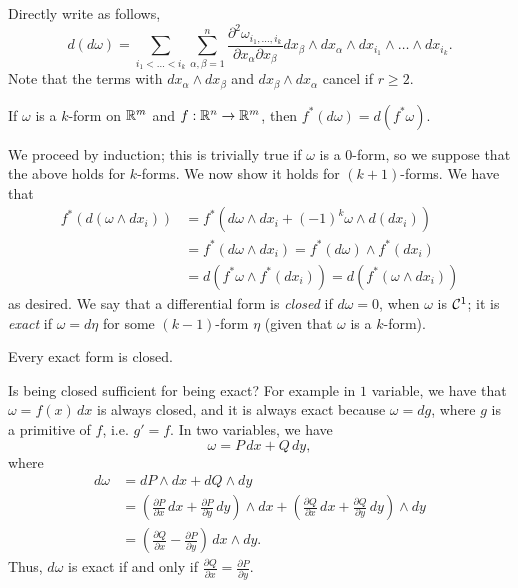 \noindent Directly write as follows,
\[ d(d\omega) = \sum_{i_1 < \dots < i_k} \sum_{\alpha, \beta = 1}^n \frac{\partial^2 \omega_{i_1, \dots, i_k}}{\partial x_\alpha \partial x_\beta} dx_\beta \wedge dx_\alpha \wedge dx_{i_1} \wedge \dots \wedge dx_{i_k}. \]
Note that the terms with $dx_\alpha \wedge dx_\beta$ and $dx_\beta \wedge dx_\alpha$ cancel if $r \geq 2$.
\begin{simplethm}
    If $\omega$ is a $k$-form on $\mathbb R^m$ and $f : \mathbb R^n \to \mathbb R^m$, then $f^\ast(d\omega) = d(f^\ast \omega)$.
\end{simplethm}
\noindent We proceed by induction; this is trivially true if $\omega$ is a $0$-form, so we suppose that the above holds for $k$-forms. We now show it holds for $(k+1)$-forms. We have that
\begin{align*}
    f^\ast(d(\omega \wedge dx_i)) &= f^\ast(d\omega \wedge dx_i + (-1)^k \omega \wedge d(dx_i)) \\
    &= f^\ast (d\omega \wedge dx_i) = f^\ast (d\omega) \wedge f^\ast (dx_i) \\
    &= d(f^\ast \omega \wedge f^\ast (dx_i)) = d(f^\ast(\omega \wedge dx_i))
\end{align*}
as desired.
\medskip\newline
We say that a differential form is \textit{closed} if $d\omega = 0$, when $\omega$ is $\mathcal C^1$; it is \textit{exact} if $\omega = d\eta$ for some $(k-1)$-form $\eta$ (given that $\omega$ is a $k$-form).
\begin{simpleclaim}
    Every exact form is closed.
\end{simpleclaim}
\noindent Is being closed sufficient for being exact? For example in $1$ variable, we have that $\omega = f(x) \, dx$ is always closed, and it is always exact because $\omega = dg$, where $g$ is a primitive of $f$, i.e. $g' = f$. In two variables, we have
\[ \omega = P \, dx + Q \, dy, \]
where
\begin{align*}
    d\omega &= dP \wedge dx + dQ \wedge dy \\
    &= \left(\frac{\partial P}{\partial x} \, dx + \frac{\partial P}{\partial y} \, dy\right) \wedge dx + \left(\frac{\partial Q}{\partial x} \, dx + \frac{\partial Q}{\partial y} \, dy\right) \wedge dy \\
    &= \left(\frac{\partial Q}{\partial x} - \frac{\partial P}{\partial y}\right) \, dx \wedge dy.
\end{align*}
Thus, $d\omega$ is exact if and only if $\frac{\partial Q}{\partial x} = \frac{\partial P}{\partial y}$. 